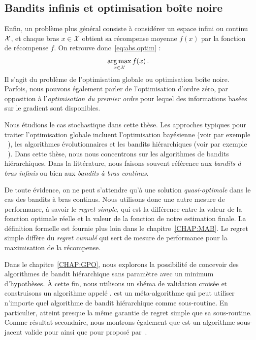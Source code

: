 \subsection{Bandits infinis et optimisation bo\^ite noire}\label{sec:abs.mab.bbo}

Enfin, un problème plus général consiste à considérer un espace infini ou continu $\mathcal{X}$, et chaque bras $x\in\mathcal{X}$ obtient sa récompense moyenne $f(x)$ par la fonction de récompense $f$. On retrouve donc~\eqref{eq:abs.optim} :
\[
    \operatorname*{arg\,max}_{x\in\mathcal{X}} f(x)\,.
\]
Il s'agit du problème de l'optimisation globale ou optimisation bo\^ite noire. Parfois, nous pouvons également parler de l'optimisation d'ordre zéro, par opposition à l'\emph{optimisation du premier ordre} pour lequel des informations basées sur le gradient sont disponibles.

Nous étudions le cas stochastique dans cette thèse. Les approches typiques pour traiter l'optimisation globale incluent l'optimisation bay\'esienne (voir par exemple ~\citealt{brochu2010bayesian}), les algorithmes évolutionnaires et les bandits hiérarchiques (voir par exemple ~\citealt{bubeck2010x}). Dans cette thèse, nous nous concentrons sur les algorithmes de bandits hiérarchiques. Dans la littérature, nous faisons souvent référence aux \emph{bandits à bras infinis} ou bien aux \emph{bandits à bras continus}.

De toute évidence, on ne peut s'attendre qu'à une solution \emph{quasi-optimale} dans le cas des bandits à bras continus. Nous utilisons donc une autre mesure de performance, à savoir le \emph{regret simple}, qui est la différence entre la valeur de la fonction optimale réelle et la valeur de la fonction de notre estimation finale. La définition formelle est fournie plus loin dans le chapitre~\ref{CHAP:MAB}.
Le regret simple diffère du \emph{regret cumul\'e} qui sert de mesure de performance pour la maximisation de la récompense. 

Dans le chapitre~\ref{CHAP:GPO}, nous explorons la possibilité de concevoir des algorithmes de bandit hiérarchique sans paramètre avec un minimum d'hypothèses. À cette fin, nous utilisons un shéma de validation croisée et construisons un algorithme appelé \GPO{}. \GPO{} est un méta-algorithme qui peut utiliser n'importe quel algorithme de bandit hiérarchique comme sous-routine. En particulier, \GPO{} atteint presque la même garantie de regret simple que sa sous-routine. Comme résultat secondaire, nous montrons également que \HCT{} est un algorithme sous-jacent valide pour \GPO{} ainsi que pour \POO{} proposé par~\cite{grill2015poo}. 

